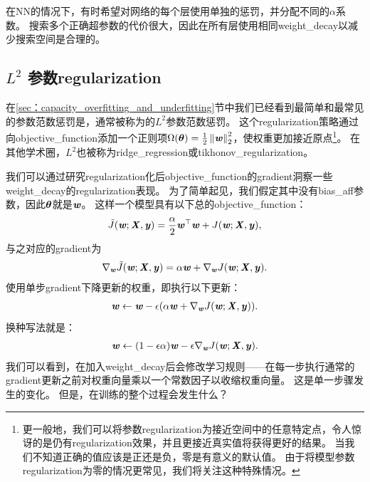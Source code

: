 在\gls{NN}的情况下，有时希望对网络的每个层使用单独的惩罚，并分配不同的$\alpha$系数。
搜索多个正确超参数的代价很大，因此在所有层使用相同\gls{weight_decay}以减少搜索空间是合理的。


\subsection{$L^2$ 参数\gls{regularization}}
\label{sec:l2_parameter_regularization}
在\ref{sec：capacity_overfitting_and_underfitting}节中我们已经看到最简单和最常见的参数范数惩罚是，通常被称为的$L^2$参数范数惩罚。
这个\gls{regularization}策略通过向\gls{objective_function}添加一个正则项$\Omega(\boldsymbol{\theta}) = \frac{1}{2} \left\lVert\boldsymbol{\mathit{w}}\right\rVert_2^2$，使权重更加接近原点\footnote{更一般地，我们可以将参数\gls{regularization}为接近空间中的任意特定点，令人惊讶的是仍有\gls{regularization}效果，并且更接近真实值将获得更好的结果。
当我们不知道正确的值应该是正还是负，零是有意义的默认值。
由于将模型参数\gls{regularization}为零的情况更常见，我们将关注这种特殊情况。}。
在其他学术圈，$L^2$也被称为\gls{ridge_regression}或\gls{tikhonov_regularization}。

我们可以通过研究\gls{regularization}化后\gls{objective_function}的\gls{gradient}洞察一些\gls{weight_decay}的\gls{regularization}表现。
为了简单起见，我们假定其中没有\gls{bias_aff}参数，因此$\boldsymbol{\theta}$就是$\boldsymbol{\mathit{w}}$。
这样一个模型具有以下总的\gls{objective_function}：
\begin{align}
  \tilde{J}(\boldsymbol{\mathit{w}};\boldsymbol{\mathit{X}}, \boldsymbol{\mathit{y}}) =\frac{\alpha}{2} \boldsymbol{\mathit{w}}^\top \boldsymbol{\mathit{w}} +  J(\boldsymbol{\mathit{w}};\boldsymbol{\mathit{X}}, \boldsymbol{\mathit{y}}),
\end{align}
与之对应的\gls{gradient}为
\begin{align}
 \nabla_{\boldsymbol{\mathit{w}}} \tilde{J}(\boldsymbol{\mathit{w}};\boldsymbol{\mathit{X}},\boldsymbol{\mathit{y}}) =\alpha \boldsymbol{\mathit{w}} +  \nabla_{\boldsymbol{\mathit{w}}} J(\boldsymbol{\mathit{w}};\boldsymbol{\mathit{X}}, \boldsymbol{\mathit{y}}).
\end{align}
使用单步\gls{gradient}下降更新的权重，即执行以下更新：
\begin{align}
 \boldsymbol{\mathit{w}} \leftarrow \boldsymbol{\mathit{w}} - \epsilon(\alpha \boldsymbol{\mathit{w}} + \nabla_{\boldsymbol{\mathit{w}}} J(\boldsymbol{\mathit{w}};\boldsymbol{\mathit{X}}, \boldsymbol{\mathit{y}})).
\end{align}
换种写法就是：
\begin{align}
 \boldsymbol{\mathit{w}} \leftarrow (1-\epsilon \alpha)\boldsymbol{\mathit{w}} - \epsilon \nabla_{\boldsymbol{\mathit{w}}} J(\boldsymbol{\mathit{w}};\boldsymbol{\mathit{X}}, \boldsymbol{\mathit{y}}).
\end{align}
我们可以看到，在加入\gls{weight_decay}后会修改学习规则——在每一步执行通常的\gls{gradient}更新之前对权重向量乘以一个常数因子以收缩权重向量。
这是单一步骤发生的变化。
但是，在训练的整个过程会发生什么？


